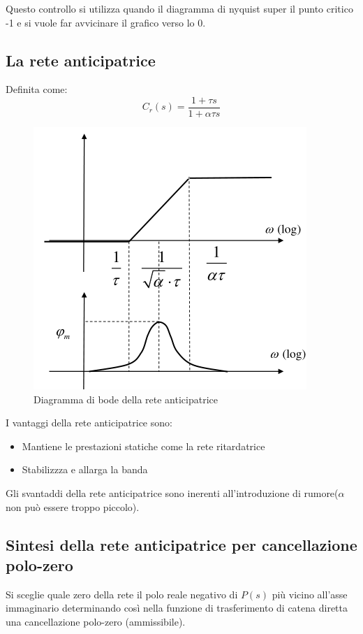 Questo controllo si utilizza quando il diagramma di nyquist super il punto critico -1
e si vuole far avvicinare il grafico verso lo 0.

\subsection{La rete anticipatrice}
Definita come:
\begin{equation}
  C_r(s) = \frac{1 + \tau s}{1 + \alpha \tau s}
  \label{eq:rete_anticipatrice}
\end{equation}

\begin{figure}[h!]
  \centering
  \includegraphics[width=0.3\linewidth]{./images/rete_anticipatrice_bode.png}
  \caption{Diagramma di bode della rete anticipatrice}
  \label{fig:rete_anticipatrice_bode}
\end{figure}

I vantaggi della rete anticipatrice sono:
\begin{itemize}
  \item Mantiene le prestazioni statiche come la rete ritardatrice
  \item Stabilizzza e allarga la banda
\end{itemize}

Gli svantaddi della rete anticipatrice sono inerenti all'introduzione di
rumore($\alpha$ non può essere troppo piccolo).

\subsection{Sintesi della rete anticipatrice per cancellazione polo-zero}
Si sceglie quale zero della rete il polo reale negativo di $P(s)$ più vicino
all’asse immaginario determinando così nella funzione di trasferimento di
catena diretta una cancellazione polo-zero (ammissibile).
